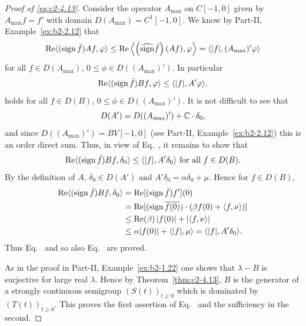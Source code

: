 \begin{example}
\begin{proof}[Proof of \eqref{eq:c2-4.13}]
Consider the operator $A_{\max}$ on $C[-1,0]$ given by $A_{\max}f = f'$ with domain $D(A_{\max}) = C^{1}[-1,0]$.
We know by Part-II, Example~\ref{ex:b2-2.12} 
that 
\[
\Re\langle(\sign  \bar{f})Af,\phi\rangle \leq \Re\left\langle\left(\widehat{\sign}  \bar{f}\right)(Af),\phi\right\rangle = \langle|f|, (A_{\max})'\phi\rangle
\]
for all $f \in D(A_{\max})$, $0 \leq \phi \in D((A_{\max})')$.
In particular
\begin{equation}\label{eq:c2-4.14}
\Re\langle(\sign  \bar{f})Bf,\phi\rangle \leq \langle|f|,A'\phi\rangle .
\end{equation}
holds for all $f \in D(B)$, $0 \leq \phi \in D((A_{\max})')$.
It is not difficult to see that 
\[
D(A') = D((A_{\max})') + \mathbb{C}\cdot\delta_{0} ,
\]
and since $D((A_{\max})') = BV[-1,0]$
(see Part-II, Example~\ref{ex:b2-2.12})
this is an order direct sum.
Thus, in view of Eq.~, it remains to show that
\begin{equation}\label{eq:c2-4.15}
\Re\langle(\sign  \bar{f})Bf,\delta_{0}\rangle \leq \langle|f|,A'\delta_{0}\rangle \text{ for all } f \in D(B) .
\end{equation}
By the definition of\/ $A$, $\delta_{0} \in D(A')$ and $A'\delta_{0} =  \alpha\delta_{0} + \mu$.
Hence for $f \in D(B)$,
\begin{align*}
\Re\langle(\sign \bar{f})Bf,\delta_{0}\rangle &= \Re[(\sign \bar{f})f'](0) \\
&= \Re[(\sign  \overline{f(0)})\cdot(\beta f(0) +  \langle f,\nu\rangle)] \\
&\leq \Re(\beta) \, |f(0)| + |\langle f,\nu\rangle| \\
&\leq \alpha|f(0)| + \langle|f|,\mu\rangle = \langle|f|,A'\delta_{0}\rangle.
\end{align*}
Thus Eq.~ and so also Eq.~ are proved.

As in the proof in  Part-II, Example~\ref{ex:b2-1.22} one shows that $\lambda - B$ is surjective for large real $\lambda$.
Hence by Theorem~\ref{thm:c2-4.13}, $B$ is the generator of a
strongly continuous semigroup $(S(t))_{t \geq 0}$ which is dominated by
$(T(t))_{t \geq 0}$.
This proves the first assertion of Eq.~ and the sufficiency in the second.


\end{proof}
\end{example}
